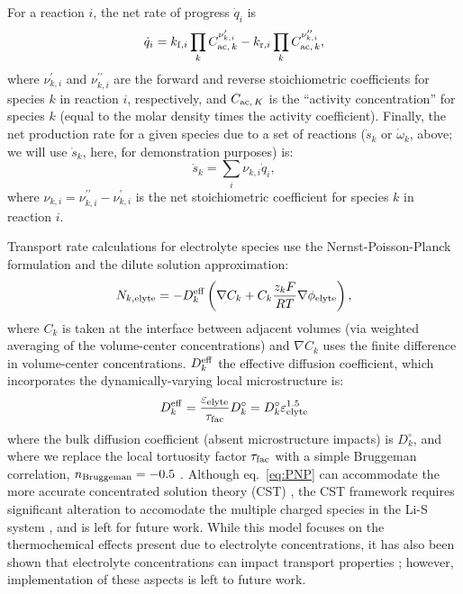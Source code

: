 \documentclass{elsarticle}
\begin{document}
For a reaction $i$, the net rate of progress $\dot{q}_i$ is
\begin{equation}\label{eq:rop_net}
    \dot{q}_i = k_{{\rm f},i}\prod_k C_{{\rm ac},\,k}^{\nu^\prime_{k,i}} -  k_{{\rm r},i}\prod_k C_{{\rm ac},\,k}^{\nu^{\prime\prime}_{k,i}},
\end{equation}
where $\nu^\prime_{k,i}$ and  $\nu^{\prime\prime}_{k,i}$ are the forward and reverse stoichiometric coefficients for species $k$ in reaction $i$, respectively, and $C_{{\rm ac},\,K}$ is the ``activity concentration'' for species $k$ (equal to the molar density times the activity coefficient).  Finally, the net production rate for a given species due to a set of reactions ($\dot{s}_k$ or $\dot{\omega}_k$, above; we will use $\dot{s}_k$, here, for demonstration purposes) is:
\begin{equation}\label{eq:net_prod_rate}
    \dot{s}_k = \sum_i \nu_{k,i}\dot{q}_i,
\end{equation}
where $\nu_{k,i}=\nu^{\prime\prime}_{k,i} - \nu^{\prime}_{k,i}$ is the net stoichiometric coefficient for species $k$ in reaction $i$.

Transport rate calculations for electrolyte species use the Nernst-Poisson-Planck formulation and the dilute solution approximation:
\begin{equation}\label{eq:PNP}
    N_{k,{\rm elyte}} = -D_k^{\rm eff}\left(\nabla C_k + C_k\frac{z_kF}{RT}\nabla \phi_{\rm elyte}\right),
\end{equation}
where $C_k$ is taken at the interface between adjacent volumes (via weighted averaging of the volume-center concentrations) and $\nabla C_k$ uses the finite difference in volume-center concentrations. $D^{\rm eff}_k$ the effective diffusion coefficient, which incorporates the dynamically-varying local microstructure is:
\begin{equation}\label{eq:Dk_eff}
    D^{\rm eff}_k = \frac{\varepsilon_{\rm elyte}}{\tau_{\rm fac}}D^\circ_k = D^\circ_k\varepsilon_{\rm elyte}^{1.5}
\end{equation}
where the bulk diffusion coefficient (absent microstructure impacts) is $D^\circ_k$, and where we replace the local tortuosity factor $\tau_{\rm fac}$ with a simple Bruggeman correlation, $n_{\rm Bruggeman} = -0.5$ \cite{TJADEN201644}.  Although eq.~\ref{eq:PNP} can accommodate the more accurate concentrated solution theory (CST) \cite{Kupper_2016}, the CST framework requires significant alteration to accomodate the multiple charged species in the Li-S system \cite{mukherjee2018}, and is left for future work. While this model focuses on the thermochemical effects present due to electrolyte concentrations, it has also been shown that electrolyte concentrations can impact transport properties \cite{Zhang2015, Robinson_2021}; however, implementation of these aspects is left to future work.
\end{document}
